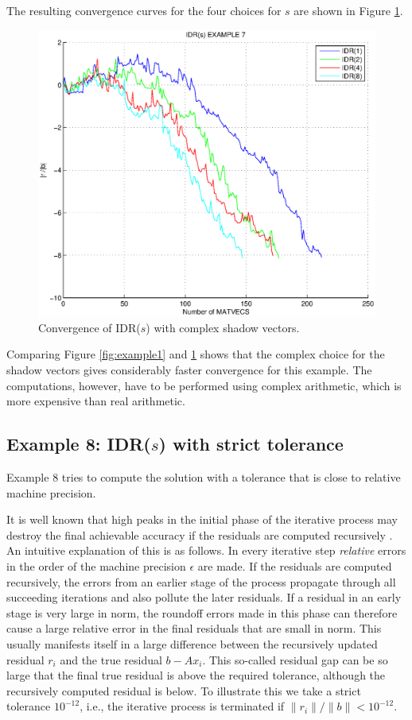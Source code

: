 \documentclass[prodmode,acmtoms]{acmsmall}
\begin{document}
The resulting convergence curves for the four choices for $s$ are shown in Figure \ref{fig:example7}.
\begin{figure}
\centering
\includegraphics[width=.60\linewidth]{example7}
\caption{Convergence of IDR($s$) with complex shadow vectors.}
\label{fig:example7}
\end{figure}
Comparing Figure \ref{fig:example1} and \ref{fig:example7} shows that the complex choice for the shadow vectors gives considerably faster 
convergence for this example. The computations, however, have to be performed using
complex arithmetic, which is more expensive than real arithmetic.

\subsection{Example 8: IDR($s$) with strict tolerance}
Example 8 tries to compute the solution with a tolerance that is close to relative machine precision.

It is well known that high peaks in the initial phase of the iterative process may destroy the final achievable accuracy
if the residuals are computed recursively \cite{peaks}. An intuitive explanation of this is as follows.  In every 
iterative step \emph{relative} errors in the order of the machine precision $\epsilon$ are made. 
If the residuals are computed recursively, the errors from an
earlier stage of the process propagate through all succeeding iterations and also pollute the later residuals. 
If a residual in an early stage is very large in norm, the roundoff errors made in this phase  
can therefore cause a large relative error in the final residuals that are small in norm. 
This usually manifests itself in a large difference between the recursively updated residual $r_i$ and the true
residual $b-Ax_i$. This so-called residual gap can be so large that the final true residual is above the required 
tolerance, although the recursively computed residual is below. To illustrate this we take a strict tolerance  
$10^{-12}$, i.e., the iterative process is terminated if $\|r_i\|/\|b\| < 10^{-12}$. 
 
\end{document}
